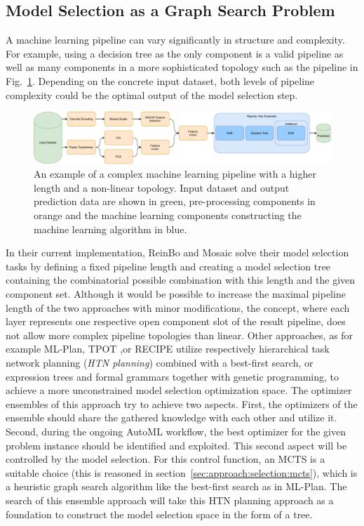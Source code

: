 \subsection{Model Selection as a Graph Search Problem}
\label{sec:approach:selection:search}
A machine learning pipeline can vary significantly in structure and complexity.
For example, using a decision tree as the only component is a valid pipeline as well as many components in a more sophisticated topology such as the pipeline in Fig.~\ref{fig:approach:complex-pipeline}.
Depending on the concrete input dataset, both levels of pipeline complexity could be the optimal output of the model selection step.
\begin{figure}[ht!]
    \centering
    \includegraphics[width=\textwidth]{gfx/Figures/Approach/ComplexPipeline.pdf}
    \caption[An example of a complex machine learning pipeline with an increased length and a non-linear topology.]{An example of a complex machine learning pipeline with a higher length and a non-linear topology. Input dataset and output prediction data are shown in green, pre-processing components in orange and the machine learning components constructing the machine learning algorithm in blue.}
    \label{fig:approach:complex-pipeline}
\end{figure}

In their current implementation, ReinBo and Mosaic solve their model selection tasks by defining a fixed pipeline length and creating a model selection tree containing the combinatorial possible combination with this length and the given component set. 
Although it would be possible to increase the maximal pipeline length of the two approaches with minor modifications, the concept, where each layer represents one respective open component slot of the result pipeline, does not allow more complex pipeline topologies than linear.\newline
Other approaches, as for example ML-Plan, TPOT ,or RECIPE utilize respectively hierarchical task network planning (\textit{HTN planning}) combined with a best-first search, or expression trees and formal grammars together with genetic programming, to achieve a more unconstrained model selection optimization space.
The optimizer ensembles of this approach try to achieve two aspects.
First, the optimizers of the ensemble should share the gathered knowledge with each other and utilize it.
Second, during the ongoing AutoML workflow, the best optimizer for the given problem instance should be identified and exploited.
This second aspect will be controlled by the model selection. 
For this control function, an MCTS is a suitable choice (this is reasoned in section~\ref{sec:approach:selection:mcts}), which is a heuristic graph search algorithm like the best-first search as in ML-Plan.
The search of this ensemble approach will take this HTN planning approach as a foundation to construct the model selection space in the form of a tree.

